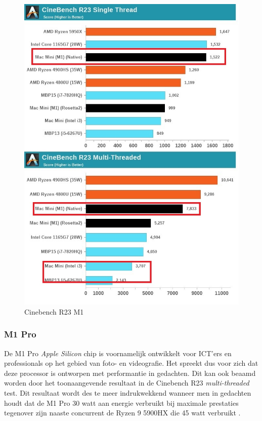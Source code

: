 \begin{figure}[!htb]
    \centering
    \includegraphics[width=\linewidth]{img/m1cinebenchr23.jpg}
    \caption{Cinebench R23 M1 \autocite{Frumusanu2020a}}
\end{figure}

\subsubsection{M1 Pro}
De M1 Pro \textit{Apple Silicon} chip is voornamelijk ontwikkelt voor ICT'ers en professionals op het gebied van foto- en videografie. Het spreekt dus voor zich dat deze processor is ontworpen met performantie in gedachten. Dit kan ook beaamd worden door het toonaangevende resultaat in de Cinebench R23 \textit{multi-threaded} test. Dit resultaat wordt des te meer indrukwekkend wanneer men in gedachten houdt dat de M1 Pro 30 watt aan energie verbruikt bij maximale prestaties tegenover zijn naaste concurrent de Ryzen 9 5900HX die 45 watt verbruikt \autocite{Schiesser2021}.

